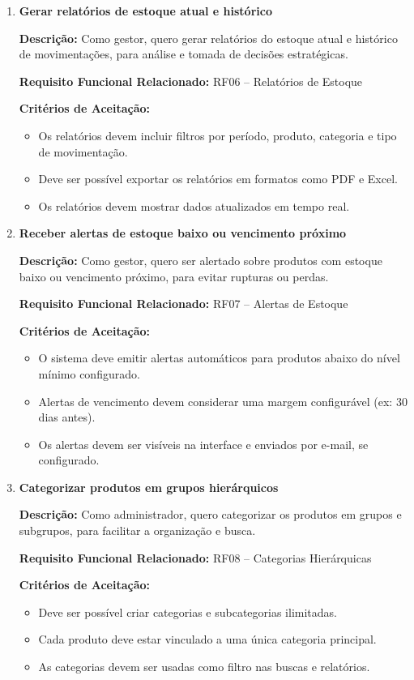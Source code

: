\documentclass[
	12pt,				%
	openany,			%
	twoside,			%
	a4paper,			%
	english,			%
	brazil				%
	]{abntex2}
\begin{document}
\begin{enumerate}
\item \textbf{Gerar relatórios de estoque atual e histórico}

\textbf{Descrição:} Como gestor, quero gerar relatórios do estoque atual e histórico de movimentações, para análise e tomada de decisões estratégicas.

\textbf{Requisito Funcional Relacionado:} RF06 -- Relatórios de Estoque

\textbf{Critérios de Aceitação:}
\begin{itemize}
  \item Os relatórios devem incluir filtros por período, produto, categoria e tipo de movimentação.
  \item Deve ser possível exportar os relatórios em formatos como PDF e Excel.
  \item Os relatórios devem mostrar dados atualizados em tempo real.
\end{itemize}

\item \textbf{Receber alertas de estoque baixo ou vencimento próximo}

\textbf{Descrição:} Como gestor, quero ser alertado sobre produtos com estoque baixo ou vencimento próximo, para evitar rupturas ou perdas.

\textbf{Requisito Funcional Relacionado:} RF07 -- Alertas de Estoque

\textbf{Critérios de Aceitação:}
\begin{itemize}
  \item O sistema deve emitir alertas automáticos para produtos abaixo do nível mínimo configurado.
  \item Alertas de vencimento devem considerar uma margem configurável (ex: 30 dias antes).
  \item Os alertas devem ser visíveis na interface e enviados por e-mail, se configurado.
\end{itemize}

\item \textbf{Categorizar produtos em grupos hierárquicos}

\textbf{Descrição:} Como administrador, quero categorizar os produtos em grupos e subgrupos, para facilitar a organização e busca.

\textbf{Requisito Funcional Relacionado:} RF08 -- Categorias Hierárquicas

\textbf{Critérios de Aceitação:}
\begin{itemize}
  \item Deve ser possível criar categorias e subcategorias ilimitadas.
  \item Cada produto deve estar vinculado a uma única categoria principal.
  \item As categorias devem ser usadas como filtro nas buscas e relatórios.
\end{itemize}


\end{enumerate}
\end{document}

